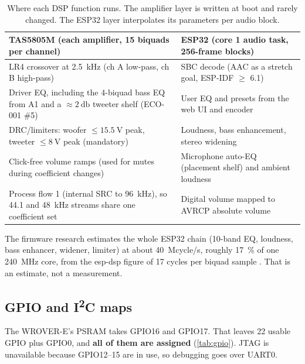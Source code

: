 \begin{table}[htbp]
\centering\small
\caption{Where each DSP function runs. The amplifier layer is written at boot and rarely changed. The ESP32 layer interpolates its parameters per audio block.}
\label{tab:dsp-split}
\begin{tabularx}{\linewidth}{@{}>{\raggedright\arraybackslash}X>{\raggedright\arraybackslash}X@{}}
\toprule
TAS5805M (each amplifier, 15 biquads per channel) & ESP32 (core 1 audio task, 256-frame blocks) \\
\midrule
LR4 crossover at \qty{2.5}{\kilo\hertz} (ch A low-pass, ch B high-pass) & SBC decode (AAC as a stretch goal, ESP-IDF $\ge$ 6.1) \\
Driver EQ, including the 4-biquad bass EQ from A1 and a $\approx\qty{+2}{\decibel}$ tweeter shelf (ECO-001 \#5) & User EQ and presets from the web UI and encoder \\
DRC/limiters: woofer $\le \qty{15.5}{\volt}$ peak, tweeter $\le \qty{8}{\volt}$ peak (mandatory) & Loudness, bass enhancement, stereo widening \\
Click-free volume ramps (used for mutes during coefficient changes) & Microphone auto-EQ (placement shelf) and ambient loudness \\
Process flow 1 (internal SRC to \qty{96}{\kilo\hertz}), so 44.1 and \qty{48}{\kilo\hertz} streams share one coefficient set & Digital volume mapped to AVRCP absolute volume \\
\bottomrule
\end{tabularx}
\end{table}

The firmware research estimates the whole ESP32 chain (10-band EQ, loudness, bass enhancer, widener, limiter) at about 40~Mcycle/s, roughly \qty{17}{\percent} of one \qty{240}{\mega\hertz} core, from the esp-dsp figure of 17 cycles per biquad sample . That is an estimate, not a measurement.

\subsection{GPIO and I\texorpdfstring{\textsuperscript{2}}{2}C maps}

The WROVER-E's PSRAM takes GPIO16 and GPIO17. That leaves 22 usable GPIO plus GPIO0, and \textbf{all of them are assigned} (\cref{tab:gpio}). JTAG is unavailable because GPIO12--15 are in use, so debugging goes over UART0.

